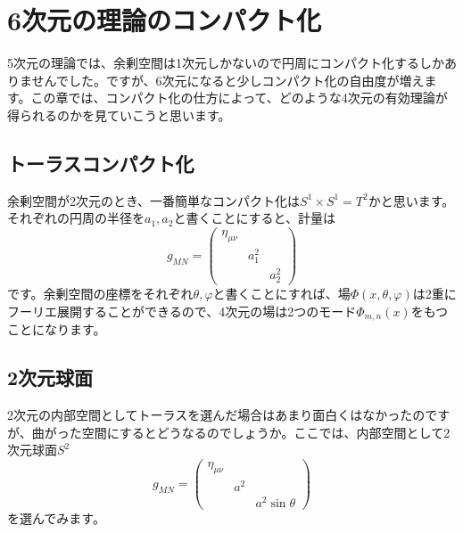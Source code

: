 \documentclass[unicode,a4paper,11pt]{ltjsarticle}
\begin{document}
\section{6次元の理論のコンパクト化}

5次元の理論では、余剰空間は1次元しかないので円周にコンパクト化するしかありませんでした。ですが、6次元になると少しコンパクト化の自由度が増えます。この章では、コンパクト化の仕方によって、どのような4次元の有効理論が得られるのかを見ていこうと思います。

\subsection{トーラスコンパクト化}

余剰空間が2次元のとき、一番簡単なコンパクト化は$S^{1}\times S^{1}=T^{2}$かと思います。それぞれの円周の半径を$a_{1},a_{2}$と書くことにすると、計量は
\begin{equation}
   g_{MN}
   =
   \begin{pmatrix}
      \eta_{\mu\nu} &         &         \\
                    & a_{1}^2 &         \\
                    &         & a_{2}^2
   \end{pmatrix}
\end{equation}
です。余剰空間の座標をそれぞれ$\theta,\varphi$と書くことにすれば、場$\Phi(x,\theta,\varphi)$は2重にフーリエ展開することができるので、4次元の場は2つのモード$\Phi_{m,n}(x)$をもつことになります。


\subsection{2次元球面}

2次元の内部空間としてトーラスを選んだ場合はあまり面白くはなかったのですが、曲がった空間にするとどうなるのでしょうか。ここでは、内部空間として2次元球面$S^{2}$
\begin{equation}
   g_{MN}
   =
   \begin{pmatrix}
      \eta_{\mu\nu} &     &               \\
                    & a^2 &               \\
                    &     & a^2\sin\theta
   \end{pmatrix}
\end{equation}
を選んでみます。
\end{document}
